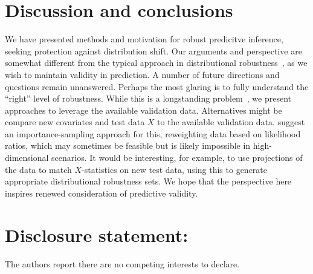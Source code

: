 
\section{Discussion and conclusions}

We have presented methods and motivation for robust predicitve inference,
seeking protection against distribution shift. Our arguments and perspective
are somewhat different from the typical approach in distributional
robustness~\cite{ DuchiNa21, BlanchetKaMu19,
  SagawaKoHaLi20}, as we wish to maintain validity in prediction.  
A number of future directions and questions remain unanswered. Perhaps
the most glaring is to fully understand the ``right'' level of
robustness. While this is a longstanding problem~\cite{DuchiNa21}, we
present approaches to leverage the available validation data.  Alternatives
might be compare new covariates and test data
$X$ to the available validation data. \citet{TibshiraniBaCaRa19}
suggest an importance-sampling approach for this, reweighting
data based on likelihood ratios, which may sometimes be feasible
but is likely impossible in high-dimensional scenarios. It would be
interesting, for example, to use projections of the data
to match $X$-statistics on new test data, using this to
generate appropriate distributional robustness sets.
We hope that the perspective here inspires renewed consideration of
predictive validity.

  
\section{Disclosure statement:}

The authors report there are no competing interests to declare.

